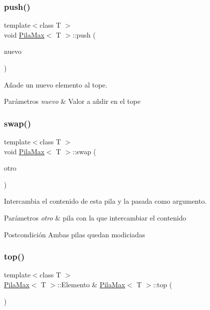 \subsubsection{\texorpdfstring{push()}{push()}}
{\footnotesize\ttfamily template$<$class T $>$ \\
void \hyperlink{classPilaMax}{Pila\+Max}$<$ T $>$\+::push (\begin{DoxyParamCaption}\item[{T \&}]{nuevo }\end{DoxyParamCaption})}



Añade un nuevo elemento al tope. 


\begin{DoxyParams}{Parámetros}
{\em nuevo} & Valor a añdir en el tope \\
\hline
\end{DoxyParams}
\mbox{\label{classPilaMax_a9736ed6ed710fc403dc2d5590a0032ae}} 
\subsubsection{\texorpdfstring{swap()}{swap()}}
{\footnotesize\ttfamily template$<$class T $>$ \\
void \hyperlink{classPilaMax}{Pila\+Max}$<$ T $>$\+::swap (\begin{DoxyParamCaption}\item[{\hyperlink{classPilaMax}{Pila\+Max}$<$ T $>$ \&}]{otro }\end{DoxyParamCaption})}



Intercambia el contenido de esta pila y la pasada como argumento. 


\begin{DoxyParams}{Parámetros}
{\em otro} & pila con la que intercambiar el contenido \\
\hline
\end{DoxyParams}
\begin{DoxyPostcond}{Postcondición}
Ambas pilas quedan modiciadas 
\end{DoxyPostcond}
\mbox{\label{classPilaMax_a8ededbe2b2180656cdbaa0a0a437fb65}} 
\subsubsection{\texorpdfstring{top()}{top()}\hspace{0.1cm}{\footnotesize\ttfamily [1/2]}}
{\footnotesize\ttfamily template$<$class T $>$ \\
\hyperlink{classPilaMax}{Pila\+Max}$<$ T $>$\+::Elemento \& \hyperlink{classPilaMax}{Pila\+Max}$<$ T $>$\+::top (\begin{DoxyParamCaption}{ }\end{DoxyParamCaption})}



